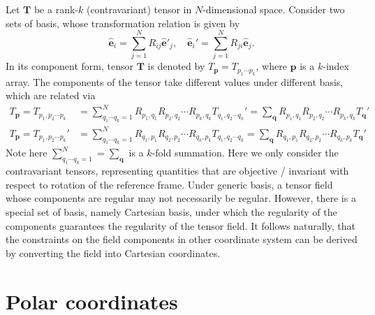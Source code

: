 \documentclass[a4paper, 11pt]{article}
\begin{document}
Let $\mathbf{T}$ be a rank-$k$ (contravariant) tensor in $N$-dimensional space. Consider two sets of basis, whose transformation relation is given by
\begin{equation}
    \hat{\mathbf{e}}_i = \sum_{j=1}^N R_{ij} \hat{\mathbf{e}}'_j,\quad 
    \hat{\mathbf{e}}_i' = \sum_{j=1}^N R_{ji} \hat{\mathbf{e}}_j.
\end{equation}
In its component form, tensor $\mathbf{T}$ is denoted by $T_\mathbf{p} = T_{p_1\cdots p_k}$, where $\mathbf{p}$ is a $k$-index array. The components of the tensor take different values under different basis, which are related via 
\begin{equation}
    \begin{aligned}
        T_\mathbf{p} = T_{p_1,p_2\cdots p_k} &= \sum_{q_1\cdots q_k=1}^N R_{p_1,q_1} R_{p_2,q_2}\cdots R_{p_k,q_k} T_{q_1,q_2\cdots q_k}' = \sum_{\mathbf{q}} R_{p_1,q_1} R_{p_2,q_2}\cdots R_{p_k,q_k} T_{\mathbf{q}}' \\
        T_\mathbf{p} = T_{p_1,p_2\cdots p_k}' &= \sum_{q_1\cdots q_k=1}^N R_{q_1,p_1} R_{q_2,p_2}\cdots R_{q_k, p_k} T_{q_1,q_2\cdots q_k} = \sum_{\mathbf{q}} R_{q_1,p_1} R_{q_2,p_2}\cdots R_{q_k, p_k} T_{\mathbf{q}}'
    \end{aligned}
\end{equation}
Note here $\sum_{q_1\cdots q_k=1}^N = \sum_\mathbf{q}$ is a $k$-fold summation. Here we only consider the contravariant tensors, representing quantities that are objective / invariant with respect to rotation of the reference frame. Under generic basis, a tensor field whose components are regular may not necessarily be regular. However, there is a special set of basis, namely Cartesian basis, under which the regularity of the components guarantees the regularity of the tensor field. It follows naturally, that the constraints on the field components in other coordinate system can be derived by converting the field into Cartesian coordinates.


\section{Polar coordinates}
\end{document}
